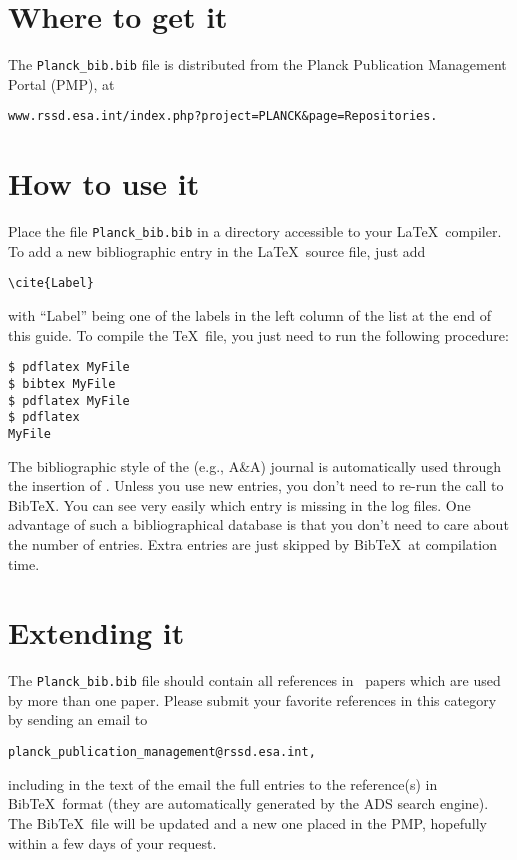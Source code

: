 \documentclass[longauth,traditabstract,referee]{aa}
\begin{document}
\section{Where to get it}

The \verb=Planck_bib.bib= file is
distributed from the Planck Publication Management Portal (PMP), at
\begin{verbatim}www.rssd.esa.int/index.php?project=PLANCK&page=Repositories.\end{verbatim}

\section{How to use it}

Place the file \verb=Planck_bib.bib= in a
directory accessible to your La\TeX\ compiler.  To add a new bibliographic
entry in the La\TeX\ source file, just add
\begin{verbatim}
\cite{Label}
\end{verbatim}
with ``Label'' being one of the labels in the left column of the list at the
end of this guide.  To compile the \TeX\ file, you just need to run the
following procedure:
\begin{verbatim}
$ pdflatex MyFile
$ bibtex MyFile
$ pdflatex MyFile
$ pdflatex
MyFile
\end{verbatim}

The bibliographic style of the (e.g., A\&A) journal is
automatically used through the insertion of
\verb==.  Unless you use new entries, you don't need to
re-run the call to Bib\TeX. You can see very easily which entry is missing in
the log files.  One advantage of such a bibliographical database is
that you don't need to care about the number of entries.  Extra
entries are just skipped by Bib\TeX\ at compilation time.

\section{Extending it}

The \verb=Planck_bib.bib= file should
contain all references in \Planck\ papers which are used by more than
one paper.  Please submit your favorite references in this category
by sending an email to
\begin{verbatim}planck_publication_management@rssd.esa.int,\end{verbatim}
including in the
text of the email the full entries to the reference(s) in Bib\TeX\
format (they are automatically generated by the ADS search engine).
The Bib\TeX\ file will be updated and a new one placed in the PMP,
hopefully within a few days of your request.
\end{document}
